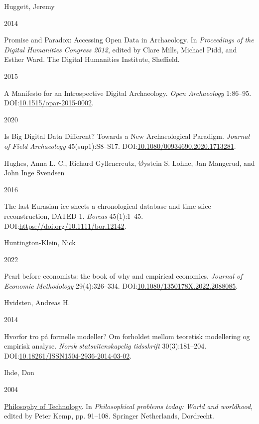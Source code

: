 \documentclass[
  12pt,
  a4paper,
  oneside]{book}
\newlength{\cslhangindent}
\newlength{\csllabelwidth}
\newlength{\cslentryspacingunit} %
\newenvironment{CSLReferences}[2] %
 {%
  \setlength{\parindent}{0pt}
  \ifodd #1
  \let\oldpar\par
  \def\par{\hangindent=\cslhangindent\oldpar}
  \fi
  \setlength{\parskip}{#2\cslentryspacingunit}
 }%
 {}
\newcommand{\CSLBlock}[1]{#1\hfill\break}
\newcommand{\CSLLeftMargin}[1]{\parbox[t]{\csllabelwidth}{#1}}
\newcommand{\CSLRightInline}[1]{\parbox[t]{\linewidth - \csllabelwidth}{#1}\break}
\begin{document}
\begin{CSLReferences}{0}{0}
\leavevmode{}%
\CSLBlock{Huggett, Jeremy}
\CSLLeftMargin{ 2014}%
\CSLRightInline{{Promise and Paradox: Accessing Open Data in Archaeology}. In \emph{{Proceedings of the Digital Humanities Congress 2012}}, edited by Clare Mills, Michael Pidd, and Esther Ward. The Digital Humanities Institute, Sheffield.}

\leavevmode{}%
\CSLLeftMargin{ 2015 }%
\CSLRightInline{{A Manifesto for an Introspective Digital Archaeology}. \emph{Open Archaeology} 1:86--95. DOI:\href{https://doi.org/10.1515/opar-2015-0002}{10.1515/opar-2015-0002}.}

\leavevmode{}%
\CSLLeftMargin{ 2020 }%
\CSLRightInline{{Is Big Digital Data Different? Towards a New Archaeological Paradigm}. \emph{Journal of Field Archaeology} 45(sup1):S8--S17. DOI:\href{https://doi.org/10.1080/00934690.2020.1713281}{10.1080/00934690.2020.1713281}.}

\leavevmode{}%
\CSLBlock{Hughes, Anna L. C., Richard Gyllencreutz, Øystein S. Lohne, Jan Mangerud, and John Inge Svendsen}
\CSLLeftMargin{ 2016}%
\CSLRightInline{The last Eurasian ice sheets {\textendash} a chronological database and time-slice reconstruction, DATED-1. \emph{Boreas} 45(1):1--45. DOI:\url{https://doi.org/10.1111/bor.12142}.}

\leavevmode{}%
\CSLBlock{Huntington-Klein, Nick}
\CSLLeftMargin{ 2022}%
\CSLRightInline{Pearl before economists: the book of why and empirical economics. \emph{Journal of Economic Methodology} 29(4):326--334. DOI:\href{https://doi.org/10.1080/1350178X.2022.2088085}{10.1080/1350178X.2022.2088085}.}

\leavevmode{}%
\CSLBlock{Hvidsten, Andreas H.}
\CSLLeftMargin{ 2014}%
\CSLRightInline{{Hvorfor tro på formelle modeller? Om forholdet mellom teoretisk modellering og empirisk analyse}. \emph{Norsk statsvitenskapelig tidsskrift} 30(3):181--204. DOI:\href{https://doi.org/10.18261/ISSN1504-2936-2014-03-02}{10.18261/ISSN1504-2936-2014-03-02}.}

\leavevmode{}%
\CSLBlock{Ihde, Don}
\CSLLeftMargin{ 2004}%
\CSLRightInline{\href{https://doi.org/10.1007/1-4020-3027-4_3}{{Philosophy of Technology}}. In \emph{Philosophical problems today: World and worldhood}, edited by Peter Kemp, pp. 91--108. Springer Netherlands, Dordrecht.}


\end{CSLReferences}
\end{document}

